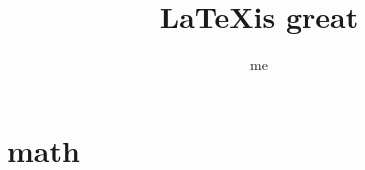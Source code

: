 \documentclass[12pt,oneside]{book}
\begin{document}
  \title{\LaTeX is great}
  \author{me}
  \maketitle

    \clearpage
    \tableofcontents
    \clearpage
    \listoftables
    \clearpage
    \listoffigures

    \begin{singlespace}
    \renewcommand{\glossarypreamble}{\thispagestyle{myheadings}} %
    \printglossary[type=\acronymtype]
    \clearpage
    \end{singlespace}

     
     
     
     


    \appendix
    \chapter{math}
    \renewcommand{\bibname}{REFERENCES}
    \begin{singlespace}
    \printbibliography
    \end{singlespace}
\end{document}
